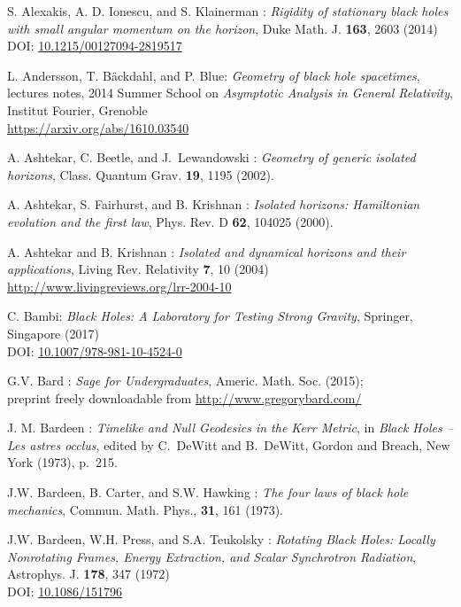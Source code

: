 \begin{thebibliography}{123}

S. Alexakis, A. D. Ionescu, and S. Klainerman : {\em Rigidity of stationary black holes with small angular momentum on the horizon},
Duke Math. J. {\bf 163}, 2603 (2014)\\
DOI: \href{https://doi.org/10.1215/00127094-2819517}{10.1215/00127094-2819517}

L. Andersson, T. Bäckdahl, and P. Blue:
{\em Geometry of black hole spacetimes},
lectures notes,
2014 Summer School on {\em Asymptotic Analysis in General Relativity},
Institut Fourier, Grenoble\\
\url{https://arxiv.org/abs/1610.03540}

A. Ashtekar, C. Beetle, and J.~Lewandowski : {\em Geometry of
generic isolated horizons},
Class. Quantum Grav. {\bf 19}, 1195 (2002).

A. Ashtekar, S. Fairhurst, and B. Krishnan : {\em Isolated horizons:
Hamiltonian evolution and the first law},
Phys. Rev. D {\bf 62}, 104025 (2000).

A. Ashtekar and B. Krishnan : {\em Isolated and dynamical horizons
and their applications},
Living Rev. Relativity {\bf 7}, 10 (2004) \\
\url{http://www.livingreviews.org/lrr-2004-10}

C. Bambi: {\em Black Holes: A Laboratory for Testing Strong Gravity},
Springer, Singapore (2017)\\
DOI: \href{https://doi.org/10.1007/978-981-10-4524-0}{10.1007/978-981-10-4524-0}

G.V. Bard : {\em Sage for Undergraduates}, Americ. Math. Soc. (2015); \\
preprint freely downloadable from \url{http://www.gregorybard.com/}

J. M. Bardeen : {\em Timelike and Null Geodesics in the Kerr Metric},
in {\em Black Holes -- Les astres occlus},  edited by C.~DeWitt and B.~DeWitt,
Gordon and Breach, New York (1973), p.~215.

J.W. Bardeen, B. Carter, and S.W. Hawking : {\em The four laws of black
hole mechanics}, Commun. Math. Phys., {\bf 31}, 161 (1973).

J.W. Bardeen, W.H. Press, and S.A. Teukolsky :
{\em Rotating Black Holes: Locally Nonrotating Frames, Energy Extraction, and Scalar Synchrotron Radiation},
Astrophys. J. {\bf  178}, 347 (1972)\\
DOI: \href{https://doi.org/10.1086/151796}{10.1086/151796}


\end{thebibliography}
